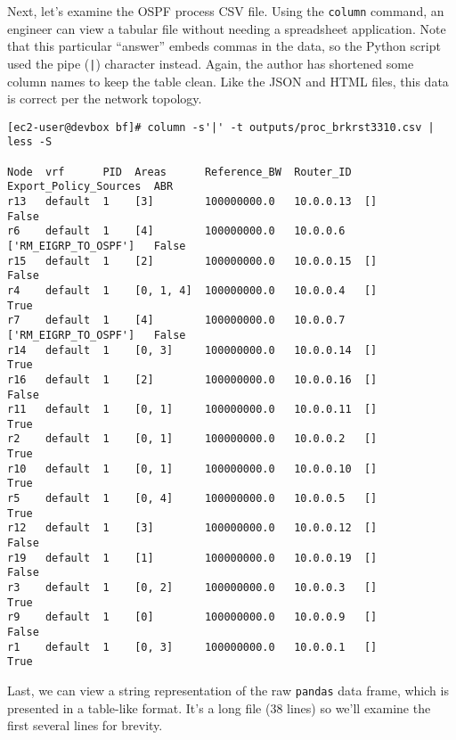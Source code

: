 
Next, let's examine the OSPF process CSV file. Using the \verb|column|
command, an engineer can view a tabular file without needing a spreadsheet
application. Note that this particular ``answer'' embeds commas in the data,
so the Python script used the pipe (\verb:|:) character instead. Again, the
author has shortened some column names to keep the table clean. Like the JSON
and HTML files, this data is correct per the network topology.

\begin{verbatim}
[ec2-user@devbox bf]# column -s'|' -t outputs/proc_brkrst3310.csv | less -S

Node  vrf      PID  Areas      Reference_BW  Router_ID  Export_Policy_Sources  ABR
r13   default  1    [3]        100000000.0   10.0.0.13  []                     False
r6    default  1    [4]        100000000.0   10.0.0.6   ['RM_EIGRP_TO_OSPF']   False
r15   default  1    [2]        100000000.0   10.0.0.15  []                     False
r4    default  1    [0, 1, 4]  100000000.0   10.0.0.4   []                     True
r7    default  1    [4]        100000000.0   10.0.0.7   ['RM_EIGRP_TO_OSPF']   False
r14   default  1    [0, 3]     100000000.0   10.0.0.14  []                     True
r16   default  1    [2]        100000000.0   10.0.0.16  []                     False
r11   default  1    [0, 1]     100000000.0   10.0.0.11  []                     True
r2    default  1    [0, 1]     100000000.0   10.0.0.2   []                     True
r10   default  1    [0, 1]     100000000.0   10.0.0.10  []                     True
r5    default  1    [0, 4]     100000000.0   10.0.0.5   []                     True
r12   default  1    [3]        100000000.0   10.0.0.12  []                     False
r19   default  1    [1]        100000000.0   10.0.0.19  []                     False
r3    default  1    [0, 2]     100000000.0   10.0.0.3   []                     True
r9    default  1    [0]        100000000.0   10.0.0.9   []                     False
r1    default  1    [0, 3]     100000000.0   10.0.0.1   []                     True
\end{verbatim}

Last, we can view a string representation of the raw \verb|pandas| data frame,
which is presented in a table-like format. It's a long file (38 lines) so
we'll examine the first several lines for brevity.

